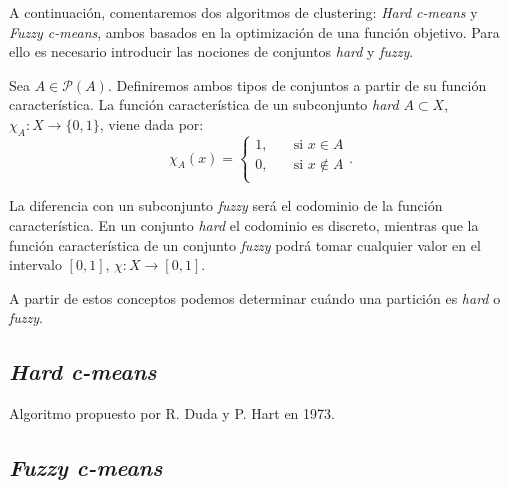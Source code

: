 \documentclass[10pt,a4paper]{article} %
\begin{document}
    A continuación, comentaremos dos algoritmos de clustering: \textit{Hard c-means} y \textit{Fuzzy c-means}, ambos basados en la optimización de una función objetivo. Para ello es necesario introducir las nociones de conjuntos \textit{hard} y \textit{fuzzy}.

    Sea $A \in \mathcal{P}(A)$. Definiremos ambos tipos de conjuntos a partir de su función característica. La función característica de un subconjunto \textit{hard} $A \subset X$, $\chi_A:X \to \{0,1\}$, viene dada por:
\[  
\chi_A(x) = 
     \begin{cases}
       1, &\quad\text{si } x \in A\\
       0, &\quad\text{si } x \notin A \\ 
     \end{cases}.
\]

La diferencia con un subconjunto \textit{fuzzy} será el codominio de la función característica. En un conjunto \textit{hard} el codominio es discreto, mientras que la función característica de un conjunto \textit{fuzzy} podrá tomar cualquier valor en el intervalo $[0,1]$, $\chi:X \to [0,1]$.

A partir de estos conceptos podemos determinar cuándo una partición es \textit{hard} o \textit{fuzzy}.


    
\subsection{\textit{Hard c-means}}
Algoritmo propuesto por R. Duda y P. Hart en 1973.
    
    \subsection{\textit{Fuzzy c-means}}
    
    \nocite{*}
    
    
\end{document}
